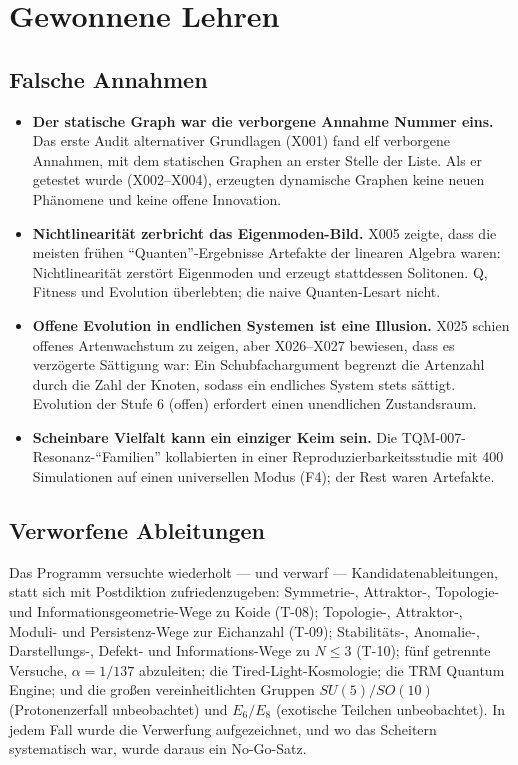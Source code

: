 \documentclass[10pt,twoside,openany]{book}
\begin{document}
\chapter{Gewonnene Lehren}
\label{ch:lessons}

\section{Falsche Annahmen}

\begin{itemize}
\item \textbf{Der statische Graph war die verborgene Annahme Nummer eins.} Das erste
Audit alternativer Grundlagen (X001) fand elf verborgene Annahmen, mit dem statischen
Graphen an erster Stelle der Liste. Als er getestet wurde (X002--X004), erzeugten
dynamische Graphen keine neuen Phänomene und keine offene Innovation.
\item \textbf{Nichtlinearität zerbricht das Eigenmoden-Bild.} X005 zeigte, dass die
meisten frühen ``Quanten''-Ergebnisse Artefakte der linearen Algebra waren:
Nichtlinearität zerstört Eigenmoden und erzeugt stattdessen Solitonen. Q, Fitness und
Evolution überlebten; die naive Quanten-Lesart nicht.
\item \textbf{Offene Evolution in endlichen Systemen ist eine Illusion.} X025 schien
offenes Artenwachstum zu zeigen, aber X026--X027 bewiesen, dass es verzögerte Sättigung
war: Ein Schubfachargument begrenzt die Artenzahl durch die Zahl der Knoten, sodass ein
endliches System stets sättigt. Evolution der Stufe 6 (offen) erfordert einen
unendlichen Zustandsraum.
\item \textbf{Scheinbare Vielfalt kann ein einziger Keim sein.} Die
TQM-007-Resonanz-``Familien'' kollabierten in einer Reproduzierbarkeitsstudie mit 400
Simulationen auf einen universellen Modus (F4); der Rest waren Artefakte.
\end{itemize}

\section{Verworfene Ableitungen}

Das Programm versuchte wiederholt --- und verwarf --- Kandidatenableitungen, statt sich
mit Postdiktion zufriedenzugeben: Symmetrie-, Attraktor-, Topologie- und
Informationsgeometrie-Wege zu Koide (T-08); Topologie-, Attraktor-, Moduli- und
Persistenz-Wege zur Eichanzahl (T-09); Stabilitäts-, Anomalie-, Darstellungs-, Defekt-
und Informations-Wege zu $N\le3$ (T-10); fünf getrennte Versuche, $\alpha=1/137$
abzuleiten; die Tired-Light-Kosmologie; die TRM Quantum Engine; und die großen
vereinheitlichten Gruppen $SU(5)/SO(10)$ (Protonenzerfall unbeobachtet) und $E_6/E_8$
(exotische Teilchen unbeobachtet). In jedem Fall wurde die Verwerfung aufgezeichnet, und
wo das Scheitern systematisch war, wurde daraus ein No-Go-Satz.
\end{document}

